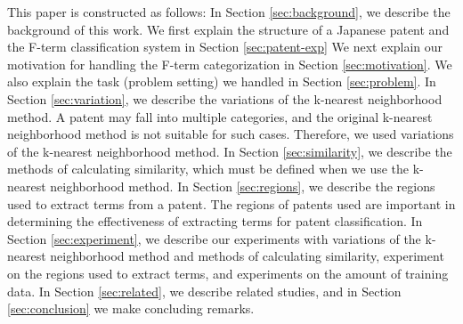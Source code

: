 \documentclass[english]{jnlp_1.2c}
\begin{document}
This paper is constructed as follows:
In Section \ref{sec:background}, we describe
the background of this work. 
We first explain the structure of a Japanese patent and 
the F-term classification system in Section \ref{sec:patent-exp}
We next explain our motivation for
handling the F-term categorization in Section \ref{sec:motivation}. 
We also explain the task (problem setting) 
we handled in Section \ref{sec:problem}. 
In Section \ref{sec:variation}, we describe the 
variations of the k-nearest neighborhood method. 
A patent may fall into multiple categories, and
the original k-nearest neighborhood method is not suitable for such cases. 
Therefore, we used variations of the k-nearest neighborhood method. 
In Section \ref{sec:similarity}, we describe the 
methods of calculating similarity, 
which must be defined
when we use the k-nearest neighborhood method.
In Section \ref{sec:regions}, we describe the 
regions used to extract terms from a patent. 
The regions of patents used are 
important in determining the effectiveness
of extracting terms for patent classification. 
In Section \ref{sec:experiment}, we describe our
experiments with variations of 
the k-nearest neighborhood method and methods of calculating 
similarity, 
experiment on the regions used to extract terms, and 
experiments on the amount of training data. 
In Section \ref{sec:related}, we describe
related studies, and 
in Section \ref{sec:conclusion} we 
make concluding remarks. 
\end{document}
